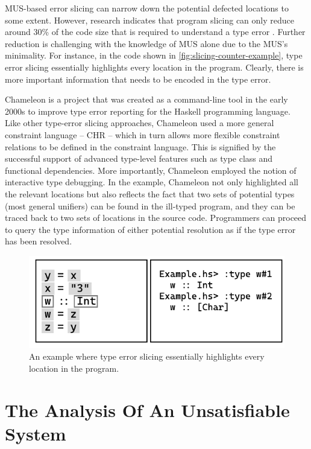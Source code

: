 MUS-based error slicing can narrow down the potential defected locations to some extent. However, research indicates that program slicing can only reduce around 30\% of the code size that is required to understand a type error \cite{binkley_empirical_2007}. Further reduction is challenging with the knowledge of MUS alone due to the MUS's minimality. For instance, in the code shown in \ref{fig:slicing-counter-example}, type error slicing essentially highlights every location in the program. Clearly, there is more important information that needs to be encoded in the type error.

Chameleon \cite{Stuckey2003-pz} is a project that was created as a command-line tool in the early 2000s to improve type error reporting 
for the Haskell programming language. Like other type-error slicing approaches, Chameleon used a more general constraint language -- CHR -- which in turn allows more flexible constraint relations to be defined in the constraint language. This is signified by the successful support of advanced type-level features such as type class and functional dependencies. More importantly, Chameleon employed the notion of interactive type debugging. In the example, Chameleon not only highlighted all the relevant locations but also reflects the fact that two sets of potential types (most general unifiers) can be found in the ill-typed program, and they can be traced back to two sets of locations in the source code. Programmers can proceed to query the type information of either potential resolution as if the type error has been resolved.


\begin{figure}[hbt]
  \includegraphics[width=0.8\linewidth]{ChameleonInteractive}
  \caption{
    \label{fig:chameleon-interactive}
      An example where type error slicing essentially highlights every location in the program.}
\end{figure}

\section{The Analysis Of An Unsatisfiable System}

